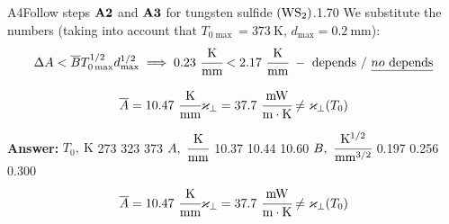 \documentclass[11pt,a4paper]{article}
\begin{document}
\begin{solcard}{A4}{Follow steps $\bf A2$ and $\bf A3$ for tungsten sulfide $\rm(WS_2)$.}{1.70}
We substitute the numbers (taking into account that $T_{0\max}=373~\mathrm{K}$, $d_{\max}=0.2~\mathrm{mm}$): \[\Delta A < \overline BT_{0\max}^{1/2}d_{\max}^{1/2}\implies0.23~\cfrac{\mathrm{K}}{\mathrm{mm}} < 2.17~\cfrac{\mathrm{K}}{\mathrm{mm}}~-~\text{depends}~/~\underline{no~\text{depends}}\]


\[\overline{A}=10.47~\cfrac{\mathrm{K}}{\mathrm{mm}}\\\varkappa_\perp=37.7~\cfrac{\mathrm{mW}}{\text{m}\cdot\text{K}}\ne\varkappa_\perp(T_0)\]

\par\smallskip\noindent\textbf{Answer:} $T_0,~\mathrm{K}$ 273 323 373 $A,~\cfrac{\mathrm{K}}{\mathrm{mm}}$ 10.37 10.44 10.60 $B,~\cfrac{\mathrm{K}^{1/2}}{\mathrm{mm}^{3/2}}$ 0.197 0.256 0.300 \[\overline{A}=10.47~\cfrac{\mathrm{K}}{\mathrm{mm}}\\\varkappa_\perp=37.7~\cfrac{\mathrm{mW}}{\text{m}\cdot\text{K}}\ne\varkappa_\perp(T_0)\]
\end{solcard}
\end{document}
